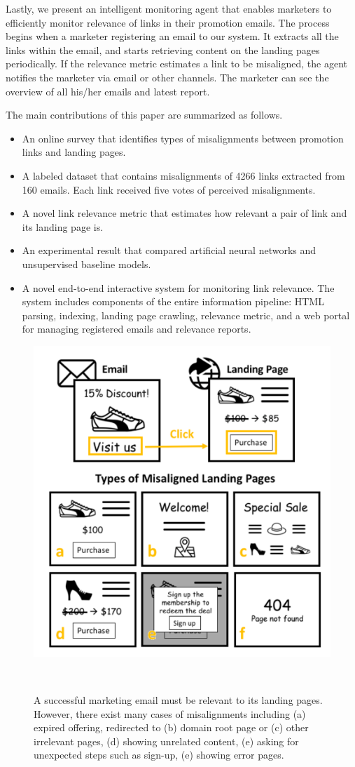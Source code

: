 \documentclass{sigchi}
\begin{document}
Lastly, we present an intelligent monitoring agent that enables marketers to efficiently monitor relevance of links in their promotion emails. The process begins when a marketer registering an email to our system. It extracts all the links within the email, and starts retrieving content on the landing pages periodically. If the relevance metric estimates a link to be misaligned, the agent notifies the marketer via email or other channels. The marketer can see the overview of all his/her emails and latest report. 

The main contributions of this paper are summarized as follows.
\begin{itemize}
\item An online survey that identifies types of misalignments between promotion links and landing pages. 
\item A labeled dataset that contains misalignments of 4266 links extracted from 160 emails. Each link received five votes of perceived misalignments. 
\item A novel link relevance metric that estimates how relevant a pair of link and its landing page is.  
\item An experimental result that compared artificial neural networks and unsupervised baseline models.


\item A novel end-to-end interactive system for monitoring link relevance. The system includes components of the entire information pipeline: HTML parsing, indexing, landing page crawling, relevance metric, and a web portal for managing registered emails and relevance reports. 
\end{itemize}

\begin{figure}
\centering
  \includegraphics[width=0.75\columnwidth]{figures/types}
  \caption{A successful marketing email must be relevant to its landing pages. However, there exist many cases of misalignments including (a) expired offering, redirected to (b) domain root page or (c) other irrelevant pages, (d) showing unrelated content, (e) asking for unexpected steps such as sign-up, (e) showing error pages.}~\label{fig:shoes}
\end{figure}
\end{document}
